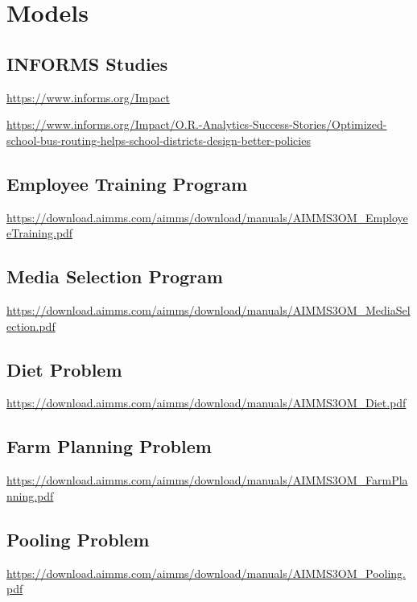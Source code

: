 \documentclass[../open-optimization/open-optimization.tex]{subfiles}
\begin{document}
\section{Models}



\subsection{INFORMS Studies}
\url{https://www.informs.org/Impact}


\url{https://www.informs.org/Impact/O.R.-Analytics-Success-Stories/Optimized-school-bus-routing-helps-school-districts-design-better-policies}

\subsection{Employee Training Program}
\url{https://download.aimms.com/aimms/download/manuals/AIMMS3OM_EmployeeTraining.pdf}

\subsection{Media Selection Program}
\url{https://download.aimms.com/aimms/download/manuals/AIMMS3OM_MediaSelection.pdf}

\subsection{Diet Problem}
\url{https://download.aimms.com/aimms/download/manuals/AIMMS3OM_Diet.pdf}

\subsection{Farm Planning Problem}
\url{https://download.aimms.com/aimms/download/manuals/AIMMS3OM_FarmPlanning.pdf}

\subsection{Pooling Problem}
\url{https://download.aimms.com/aimms/download/manuals/AIMMS3OM_Pooling.pdf}

\end{document}
